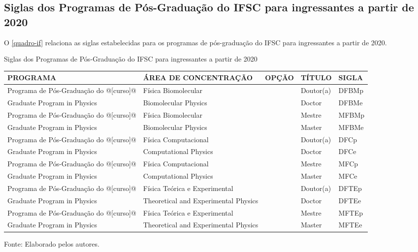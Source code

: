 \begin{apendicesenv}
\chapter{Siglas dos Programas de Pós-Graduação do IFSC para ingressantes a partir de 2020}
O \autoref{quadro-if} relaciona as siglas estabelecidas para os programas de pós-graduação do IFSC para ingressantes a partir de 2020.
\begin{quadro}[htb] 
	\ABNTEXfontereduzida
	\caption[Siglas dos Programas de Pós-Graduação do IFSC para ingressantes a partir de 2020]{Siglas dos Programas de Pós-Graduação do IFSC para ingressantes a partir de 2020}
	\label{quadro-if}
	\begin{tabular}{|p{4.5cm}|p{4.0cm}|p{2.0cm}|p{1.5cm}|p{2.25cm}|}
		\hline
		\textbf{PROGRAMA} & \textbf{ÁREA DE CONCENTRAÇÃO} & \textbf{OPÇÃO} & \textbf{TÍTULO} & \textbf{SIGLA}  \\
		\hline
		Programa de Pós-Graduação do @[curso]@& Física Biomolecular &  & Doutor(a) & DFBMp\\
		Graduate Program in Physics & Biomolecular Physics &  & Doctor & DFBMe\\
		Programa de Pós-Graduação do @[curso]@& Física Biomolecular &  & Mestre & MFBMp\\		
		Graduate Program in Physics & Biomolecular Physics &  & Master & MFBMe\\
		Programa de Pós-Graduação do @[curso]@& Física Computacional &  & Doutor(a) & DFCp\\
		Graduate Program in Physics & Computational Physics &  & Doctor & DFCe\\
		Programa de Pós-Graduação do @[curso]@& Física Computacional &  & Mestre & MFCp\\		
		Graduate Program in Physics & Computational Physics &  & Master & MFCe\\
		Programa de Pós-Graduação do @[curso]@& Física Teórica e Experimental &  & Doutor(a) & DFTEp\\		
		Graduate Program in Physics & Theoretical and Experimental Physics &  & Doctor & DFTEe\\
		Programa de Pós-Graduação do @[curso]@& Física Teórica e Experimental &  & Mestre & MFTEp\\
		Graduate Program in Physics & Theoretical and Experimental Physics &  & Master & MFTEe\\
		\hline
	\end{tabular}
	\begin{flushleft}
		Fonte: Elaborado pelos autores.\
	\end{flushleft}
\end{quadro}


\end{apendicesenv}
